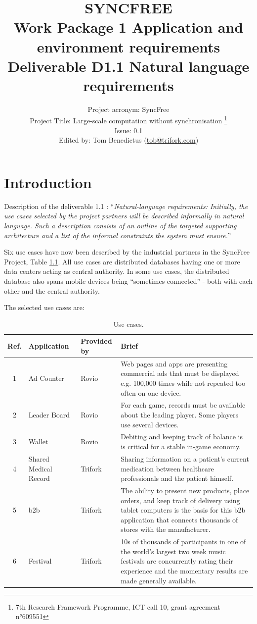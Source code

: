 \documentclass[11pt,a4paper]{report}
\title{{\Huge SYNCFREE} \\ Work Package 1 Application and environment requirements \\ Deliverable D1.1 Natural language requirements}
\author{Project acronym: SyncFree\\Project Title: Large-scale computation without synchronisation \thanks{7th Research Framework Programme, ICT call 10, grant agreement n°609551}\\Issue: 0.1\\Edited by: Tom Benedictus (\href{mailto:tob@trifork.com}{tob@trifork.com})}
\begin{document}
\maketitle

\newpage

\tableofcontents{}

\chapter{Introduction}

Description of the deliverable 1.1 : ``{\em Natural-language
  requirements: Initially, the use cases selected by the project
  partners will be described informally in natural language. Such a
  description consists of an outline of the targeted supporting
  architecture and a list of the informal constraints the system must
  ensure.}''

Six use cases have now been described by the industrial partners in
the SyncFree Project, Table \ref{tb:use_cases}. All use cases are distributed databases having
one or more data centers acting as central authority.
In some use cases, the distributed database also spans mobile devices
being ``sometimes connected'' - both with each other and the central
authority.

The selected use cases are:
\begin{table}[htb] \centering
		\begin{tabular}{| c | l | l | p{8.5cm} |}
			\hline
			Ref. & Application & Provided by & Brief \\ \hline
			1 & Ad Counter & Rovio & Web pages and apps are presenting commercial ads that must be displayed e.g. 100,000 times while not repeated too often on one device.\\ \hline
			2 & Leader Board & Rovio & For each game, records must be available about the leading player. Some players use several devices. \\ \hline
			3 & Wallet & Rovio & Debiting and keeping track of balance is is critical for a stable in-game economy. \\ \hline
			4 & Shared Medical Record & Trifork & Sharing information on a patient's current medication between healthcare professionals and the patient himself. \\ \hline
			5 & \gls{b2b} & Trifork & The ability to present new products, place orders, and keep track of delivery using tablet computers is the basis for this \gls{b2b} application that connects thousands of stores with the manufacturer. \\ \hline
			6 & Festival & Trifork & 10s of thousands of participants in one of the world's largest two week music festivals are concurrently rating their experience and the momentary results are made generally available. \\ \hline
		\end{tabular}
		
		\caption{Use cases.}
		\label{tb:use_cases}
\end{table}
              
\end{document}
